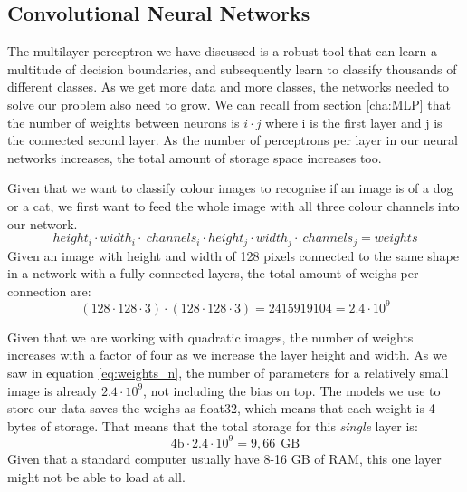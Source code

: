     
\subsection{Convolutional Neural Networks}
\label{cha:convNet}
The multilayer perceptron we have discussed is a robust tool that can learn a multitude of decision boundaries, and subsequently learn to classify thousands of different classes. 
As we get more data and more classes, the networks needed to solve our problem also need to grow. We can recall from section \ref{cha:MLP} that the number of weights between neurons is $i \cdot j$ where i is the first layer and j is the connected second layer. As the number of perceptrons per layer in our neural networks increases, the total amount of storage space increases too. 

Given that we want to classify colour images to recognise if an image is of a dog or a cat, we first want to feed the whole image with all three colour channels into our network.
\begin{equation}
    \label{eq:weights_l}
     height_i \cdot width_i \cdot \ channels_i \cdot height_j \cdot width_j \cdot \ channels_j  = weights
\end{equation}
Given an image with height and width of 128 pixels connected to the same shape in a network with a fully connected layers, the total amount of weighs per connection  are:\\
\begin{equation}
    \label{eq:weights_n}
     (128\cdot 128\cdot 3) \cdot (128\cdot 128\cdot 3) = 2415919104  = 2.4\cdot 10^9
\end{equation}

Given that we are working with quadratic images, the number of weights increases with a factor of four as we increase the layer height and width. As we saw in equation \ref{eq:weights_n}, the number of parameters for a relatively small image is already $2.4 \cdot 10^9$, not including the bias on top.
The models we use to store our data saves the weighs as float32, which means that each weight is 4 bytes of storage. That means that the total storage for this \textit{single} layer is:
\begin{equation}
    \label{eq:weights_GB}
    4\text{b} \cdot 2.4 \cdot 10^9 = 9,66 \ \ \text{GB}
\end{equation}
Given that a standard computer usually have 8-16 GB of RAM, this one layer might not be able to load at all. 
 




